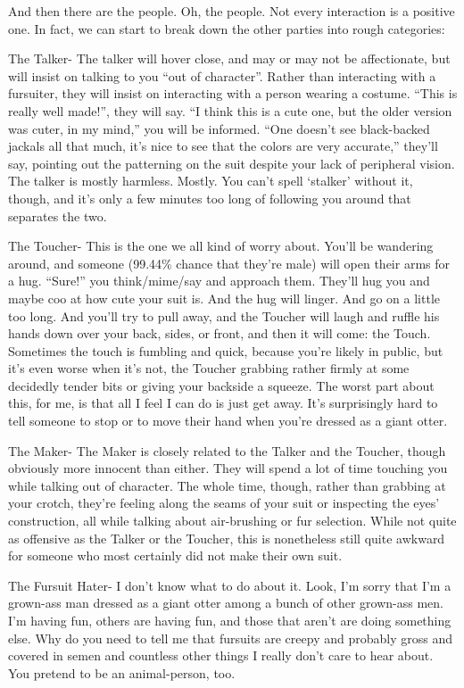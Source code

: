 And then there are the people. Oh, the people. Not every interaction is a positive one. In fact, we can start to break down the other parties into rough categories:

The Talker- The talker will hover close, and may or may not be affectionate, but will insist on talking to you ``out of character''. Rather than interacting with a fursuiter, they will insist on interacting with a person wearing a costume. ``This is really well made!'', they will say. ``I think this is a cute one, but the older version was cuter, in my mind,'' you will be informed. ``One doesn't see black-backed jackals all that much, it's nice to see that the colors are very accurate,'' they'll say, pointing out the patterning on the suit despite your lack of peripheral vision. The talker is mostly harmless. Mostly. You can't spell `stalker' without it, though, and it's only a few minutes too long of following you around that separates the two.

The Toucher- This is the one we all kind of worry about. You'll be wandering around, and someone (99.44\% chance that they're male) will open their arms for a hug. ``Sure!'' you think/mime/say and approach them. They'll hug you and maybe coo at how cute your suit is. And the hug will linger. And go on a little too long. And you'll try to pull away, and the Toucher will laugh and ruffle his hands down over your back, sides, or front, and then it will come: the Touch. Sometimes the touch is fumbling and quick, because you're likely in public, but it's even worse when it's not, the Toucher grabbing rather firmly at some decidedly tender bits or giving your backside a squeeze. The worst part about this, for me, is that all I feel I can do is just get away. It's surprisingly hard to tell someone to stop or to move their hand when you're dressed as a giant otter.

The Maker- The Maker is closely related to the Talker and the Toucher, though obviously more innocent than either. They will spend a lot of time touching you while talking out of character. The whole time, though, rather than grabbing at your crotch, they're feeling along the seams of your suit or inspecting the eyes' construction, all while talking about air-brushing or fur selection. While not quite as offensive as the Talker or the Toucher, this is nonetheless still quite awkward for someone who most certainly did not make their own suit.

The Fursuit Hater- I don't know what to do about it. Look, I'm sorry that I'm a grown-ass man dressed as a giant otter among a bunch of other grown-ass men. I'm having fun, others are having fun, and those that aren't are doing something else. Why do you need to tell me that fursuits are creepy and probably gross and covered in semen and countless other things I really don't care to hear about. You pretend to be an animal-person, too.

